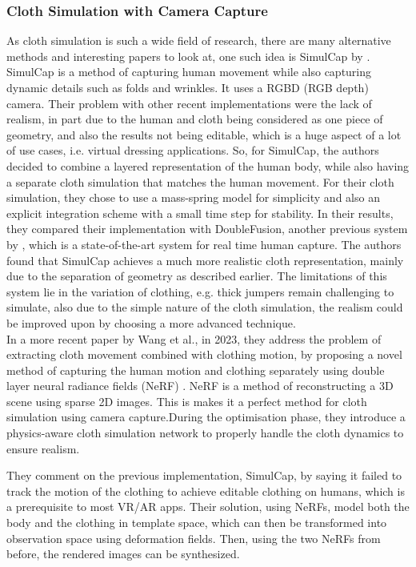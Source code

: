 \documentclass[12pt,a4paper]{article}
\begin{document}
\subsubsection{Cloth Simulation with Camera Capture}
As cloth simulation is such a wide field of research, there are many alternative methods and interesting papers to look at, one such idea is SimulCap by \cite{Yu_2019_CVPR}. SimulCap is a method of capturing human movement while also capturing dynamic details such as folds and wrinkles. It uses a RGBD (RGB depth) camera. Their problem with other recent implementations were the lack of realism, in part due to the human and cloth being considered as one piece of geometry, and also the results not being editable, which is a huge aspect of a lot of use cases, i.e. virtual dressing applications. So, for SimulCap, the authors decided to combine a layered representation of the human body, while also having a separate cloth simulation that matches the human movement. For their cloth simulation, they chose to use a mass-spring model for simplicity and also an explicit integration scheme with a small time step for stability. In their results, they compared their implementation with DoubleFusion, another previous system by \cite{yu2018doublefusion}, which is a state-of-the-art system for real time human capture. The authors found that SimulCap achieves a much more realistic cloth representation, mainly due to the separation of geometry as described earlier. The limitations of this system lie in the variation of clothing, e.g. thick jumpers remain challenging to simulate, also due to the simple nature of the cloth simulation, the realism could be improved upon by choosing a more advanced technique. \\

In a more recent paper by Wang et al., in 2023, they address the problem of extracting cloth movement combined with clothing motion, by proposing a novel method of capturing the human motion and clothing separately using double layer neural radiance fields (NeRF) \cite{Wang_2023_CVPR}. NeRF is a method of reconstructing a 3D scene using sparse 2D images. This is makes it a perfect method for cloth simulation using camera capture.During the optimisation phase, they introduce a physics-aware cloth simulation network to properly handle the cloth dynamics to ensure realism.

They comment on the previous implementation, SimulCap, by saying it failed to track the motion of the clothing to achieve editable clothing on humans, which is a prerequisite to most VR/AR apps. Their solution, using NeRFs, model both the body and the clothing in template space, which can then be transformed into observation space using deformation fields. Then, using the two NeRFs from before, the rendered images can be synthesized.
\end{document}
